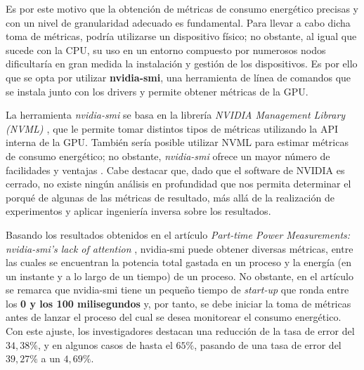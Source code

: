 Es por este motivo que la obtención de métricas de consumo energético precisas y con un nivel de granularidad adecuado es fundamental. Para llevar a cabo dicha toma de métricas, podría utilizarse un dispositivo físico; no obstante, al igual que sucede con la CPU, su uso en un entorno compuesto por numerosos nodos dificultaría en gran medida la instalación y gestión de los dispositivos. Es por ello que se opta por utilizar \textbf{nvidia-smi}, una herramienta de línea de comandos que se instala junto con los drivers y permite obtener métricas de la GPU. 

La herramienta \textit{nvidia-smi} se basa en la librería \textit{NVIDIA Management Library (NVML) \cite{nvml-api-officialdoc}}, que le permite tomar distintos tipos de métricas utilizando la API interna de la GPU. También sería posible utilizar NVML para estimar métricas de consumo energético; no obstante, \textit{nvidia-smi} ofrece un mayor número de facilidades y ventajas \cite{nvidia-smi-documentation}. Cabe destacar que, dado que el software de NVIDIA es cerrado, no existe ningún análisis en profundidad que nos permita determinar el porqué de algunas de las métricas de resultado, más allá de la realización de experimentos y aplicar ingeniería inversa sobre los resultados. 

Basando los resultados obtenidos en el artículo \textit{Part-time Power Measurements: nvidia-smi’s lack of attention} \cite{gpu-measument-survery}, nvidia-smi puede obtener diversas métricas, entre las cuales se encuentran la potencia total gastada en un proceso y la energía (en un instante y a lo largo de un tiempo) de un proceso. No obstante, en el artículo se remarca que nvidia-smi tiene un pequeño tiempo de \textit{start-up} que ronda entre los \textbf{0 y los 100 milisegundos} y, por tanto, se debe iniciar la toma de métricas antes de lanzar el proceso del cual se desea monitorear el consumo energético. Con este ajuste, los investigadores destacan una reducción de la tasa de error del $34,38\%$, y en algunos casos de hasta el $65\%$, pasando de una tasa de error del $39,27\%$ a un $4,69\%$.



 